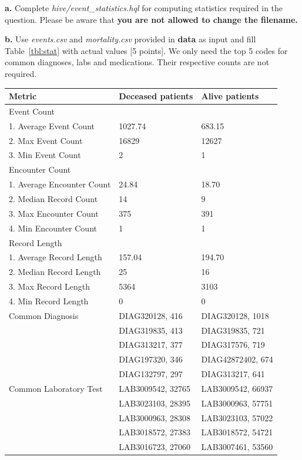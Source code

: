 \documentclass[12pt]{article}
\begin{document}
\textbf{a.} Complete \textit{hive/event\_statistics.hql} for computing statistics required in the question. Please be aware that \textbf{\color{red} you are not allowed to change the filename.} 

\textbf{b.} Use \textit{events.csv} and \textit{mortality.csv} provided in \textbf{data} as input and fill Table~\ref{tbl:stat} with actual values [5 points]. We only need the top 5 codes for common diagnoses, labs and medications. Their respective counts are not required. \\

\begin{table}[h]
\centering
\begin{tabular}{@{}l|l|l}
\toprule
Metric & Deceased patients & Alive patients  \\ \hline
Event Count & &  \\ 
1. Average Event Count & 1027.74 & 683.15 \\
2. Max Event Count  & 16829 & 12627 \\
3. Min Event Count  & 2 & 1 \\ \hline

Encounter Count & &  \\ 
1. Average Encounter Count  & 24.84 & 18.70 \\
2. Median Record Count & 14 & 9 \\
3. Max Encounter Count  & 375 & 391 \\
4. Min Encounter Count  & 1 & 1 \\ \hline

Record Length & &  \\ 
1. Average Record Length & 157.04 & 194.70 \\
2. Median Record Length & 25 & 16 \\
3. Max Record Length & 5364 & 3103 \\
4. Min Record Length & 0 & 0 \\ \hline

Common Diagnosis & DIAG320128, 416 & DIAG320128, 1018 \\
 & DIAG319835, 413 & DIAG319835, 721 \\
 & DIAG313217, 377 & DIAG317576, 719 \\
 & DIAG197320, 346 & DIAG42872402, 674 \\
 & DIAG132797, 297 & DIAG313217, 641 \\ \hline

Common Laboratory Test & LAB3009542, 32765 & LAB3009542, 66937 \\
 & LAB3023103, 28395 & LAB3000963, 57751 \\
 & LAB3000963, 28308 & LAB3023103, 57022 \\
 & LAB3018572, 27383 & LAB3018572, 54721 \\
 & LAB3016723, 27060 &  LAB3007461, 53560 \\ \hline


\end{tabular}
\end{table}
\end{document}
